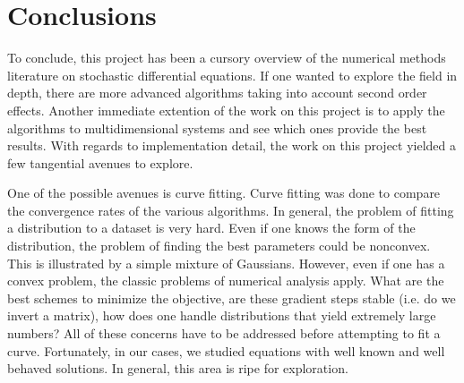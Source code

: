 \documentclass[onecolumn,notitlepage,pra,10pt,aps]{revtex4-1}
\begin{document}
\section{Conclusions}

To conclude, this project has been a cursory overview of the numerical methods literature on stochastic differential equations. If one wanted to explore the field in depth, there are more advanced algorithms taking into account second order effects. Another immediate extention of the work on this project is to apply the algorithms to multidimensional systems and see which ones provide the best results. With regards to implementation detail, the work on this project yielded a few tangential avenues to explore.

One of the possible avenues is curve fitting. Curve fitting was done to compare the convergence rates of the various algorithms. In general, the problem of fitting a distribution to a dataset is very hard. Even if one knows the form of the distribution, the problem of finding the best parameters could be nonconvex. This is illustrated by a simple mixture of Gaussians. However, even if one has a convex problem, the classic problems of numerical analysis apply. What are the best schemes to minimize the objective, are these gradient steps stable (i.e. do we invert a matrix), how does one handle distributions that yield extremely large numbers? All of these concerns have to be addressed before attempting to fit a curve. Fortunately, in our cases, we studied equations with well known and well behaved solutions. In general, this area is ripe for exploration.




\end{document}
